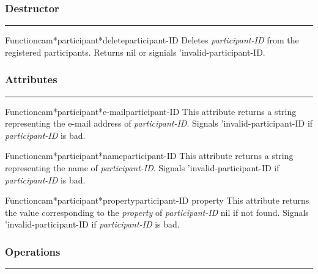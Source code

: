 \subsubsection*{Destructor}
\par\vspace*{0.00in}\par\hrule\par\medskip\par


\begin{functiondoc}{Function}{cam*participant*delete}{participant-ID}
Deletes {\em participant-ID} from the registered participants.
Returns nil or signials 'invalid-participant-ID.
\end{functiondoc}


\subsubsection*{Attributes}
\par\vspace*{0.00in}\par\hrule\par\medskip\par


\begin{functiondoc}{Function}{cam*participant*e-mail}{participant-ID}
This attribute returns a string representing the e-mail address of {\em participant-ID}.
Signals 'invalid-participant-ID if {\em participant-ID} is bad.
\end{functiondoc}

\begin{functiondoc}{Function}{cam*participant*name}{participant-ID}
This attribute returns a string representing the name of {\em participant-ID}.
Signals 'invalid-participant-ID if {\em participant-ID} is bad.
\end{functiondoc}

\begin{functiondoc}{Function}{cam*participant*property}{participant-ID property}
This attribute returns the value corresponding to the {\em property} of {\em participant-ID}
nil if not found.
Signals 'invalid-participant-ID if {\em participant-ID} is bad.
\end{functiondoc}


\subsubsection*{Operations}
\par\vspace*{0.00in}\par\hrule\par\medskip\par


